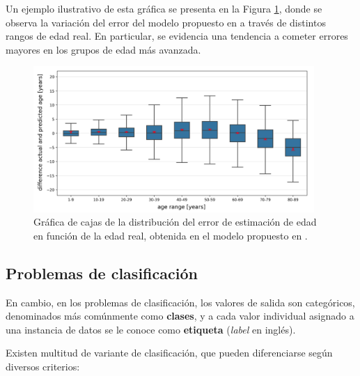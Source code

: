 \begin{itemize}
    Un ejemplo ilustrativo de esta gráfica se presenta en la Figura \ref{fig:boxplot_error_vs_act_AE}, donde se 
    observa la variación del error del modelo propuesto en \cite{heinrich2024} a través de distintos rangos de edad real. 
    En particular, se evidencia una tendencia a cometer errores mayores en los grupos de edad más avanzada.

    \begin{figure}[h]
        \centering
        \includegraphics[width=0.95\textwidth]{capitulos/cap_02/imagenes/boxplot_error_vs_act_AE.png}
        \caption{Gráfica de cajas de la distribución del error de estimación de edad en función de la edad real, 
        obtenida en el modelo propuesto en \cite{heinrich2024}.} 
        \label{fig:boxplot_error_vs_act_AE}
    \end{figure}

\end{itemize}







\subsection{Problemas de clasificación}

En cambio, en los problemas de clasificación, los valores de salida son categóricos, denominados más comúnmente como
\textbf{clases}, y a cada valor individual asignado a una instancia de datos se le conoce como \textbf{etiqueta} 
(\textit{label} en inglés).

Existen multitud de variante de clasificación, que pueden diferenciarse según diversos criterios:

